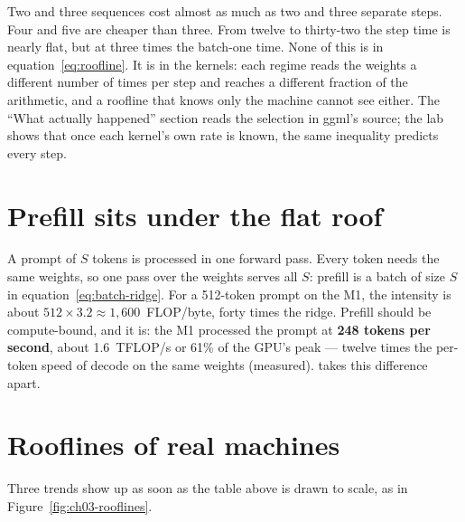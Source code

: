 
Two and three sequences cost almost as much as two and three separate steps.
Four and five are cheaper than three. From twelve to thirty-two the step time
is nearly flat, but at three times the batch-one time. None of this is in
equation~\eqref{eq:roofline}. It is in the kernels: each regime reads the
weights a different number of times per step and reaches a different fraction
of the arithmetic, and a roofline that knows only the machine cannot see
either. The ``What actually happened'' section reads the selection in ggml's
source; the lab shows that once each kernel's own rate is known, the same
inequality predicts every step.

\section{Prefill sits under the flat roof}

A prompt of $S$ tokens is processed in one forward pass. Every token needs the
same weights, so one pass over the weights serves all $S$: prefill is a batch
of size $S$ in equation~\eqref{eq:batch-ridge}. For a 512-token prompt on the
M1, the intensity is about $512\times 3.2\approx 1{,}600$~FLOP/byte, forty
times the ridge. Prefill should be compute-bound, and it is: the M1 processed
the prompt at \textbf{248 tokens per second}, about 1.6~TFLOP/s or 61\% of the
GPU's peak --- twelve times the per-token speed of decode on the same weights
(measured).  takes this difference apart.

\section{Rooflines of real machines}

Three trends show up as soon as the table above is drawn to scale, as in
Figure~\ref{fig:ch03-rooflines}.


